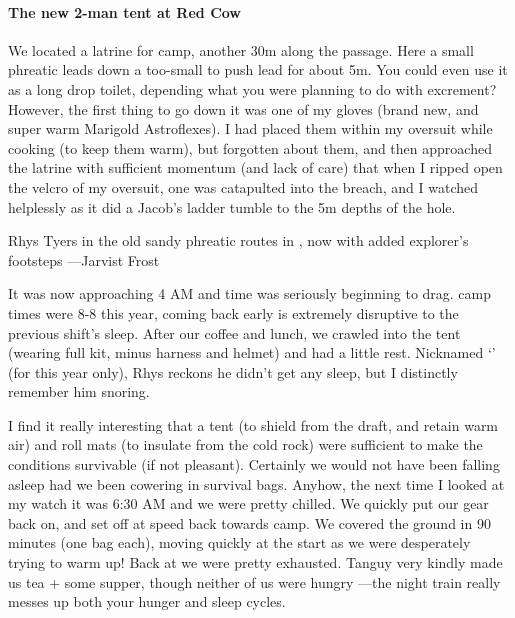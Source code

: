 \paragraph{The new 2-man tent at Red Cow} We located a latrine for camp, another 30m along the passage. Here a small phreatic leads down a too-small to push lead for about 5m. You could even use it as a long drop toilet, depending what you were planning to do with excrement? However, the first thing to go down it was one of my gloves (brand new, and super warm Marigold Astroflexes). I had placed them within my oversuit while cooking (to keep them warm), but forgotten about them, and then approached the latrine with sufficient momentum (and lack of care) that when I ripped open the velcro of my oversuit, one was catapulted into the breach, and I watched helplessly as it did a Jacob's ladder tumble to the 5m depths of the hole.

\begin{marginfigure}
\checkoddpage \ifoddpage \forcerectofloat \else \forceversofloat \fi
\centering
 \caption{Rhys Tyers in the old sandy phreatic routes in , now with added explorer's footsteps ---Jarvist Frost}
 \label{potato formations}
\end{marginfigure}

It was now approaching 4 AM and time was seriously beginning to drag.  camp times were 8-8 this year, coming back early is extremely disruptive to the previous shift's sleep. After our coffee and lunch, we crawled into the tent (wearing full kit, minus harness and helmet) and had a little rest. Nicknamed `' (for this year only), Rhys reckons he didn't get any sleep, but I distinctly remember him snoring.

I find it really interesting that a tent (to shield from the draft, and retain warm air) and roll mats (to insulate from the cold rock) were sufficient to make the conditions survivable (if not pleasant). Certainly we would not have been falling asleep had we been cowering in survival bags.
Anyhow, the next time I looked at my watch it was 6:30 AM and we were pretty chilled. We quickly put our gear back on, and set off at speed back towards camp. We covered the ground in 90 minutes (one bag each), moving quickly at the start as we were desperately trying to warm up!
Back at  we were pretty exhausted. Tanguy very kindly made us tea + some supper, though neither of us were hungry ---the night train really messes up both your hunger and sleep cycles.

